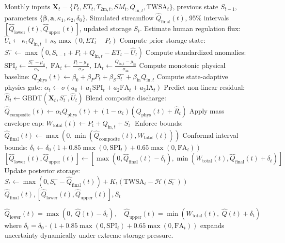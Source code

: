 \documentclass[11pt,a4paper,fleqn]{article}
\begin{document}
\begin{algorithm}[htbp]
\caption{SA-PG-MCH Dynamic State Estimation and Streamflow Inference}
\label{alg:sapgmch}
\begin{algorithmic}[1]
\REQUIRE Monthly inputs $\mathbf{X}_t = \{P_t, ET_t, T_{2\text{m},t}, SM_t, Q_{\text{in},t}, \text{TWSA}_t\}$, previous state $S_{t-1}$, parameters $\{\boldsymbol{\beta}, \mathbf{a}, \kappa_1, \kappa_2, \delta_0\}$.
\ENSURE Simulated streamflow $\hat{Q}_{\text{final}}(t)$, 95\% intervals $[\hat{Q}_{\text{lower}}(t), \hat{Q}_{\text{upper}}(t)]$, updated storage $S_t$.
\STATE Estimate human regulation flux: $\hat{U}_t \leftarrow \kappa_1 Q_{\text{in},t} + \kappa_2 \max(0, ET_t - P_t)$
\STATE Compute prior storage state: $S_t^- \leftarrow \max(0, S_{t-1} + P_t + Q_{\text{in},t} - ET_t - \hat{U}_t)$
\STATE Compute standardized anomalies: $\text{SPI}_t \leftarrow \frac{S_t^- - \mu_S}{\sigma_S}, \; \text{FA}_t \leftarrow \frac{P_t - \mu_P}{\sigma_P}, \; \text{IA}_t \leftarrow \frac{Q_{\text{in},t} - \mu_{\text{in}}}{\sigma_{\text{in}}}$
\STATE Compute monotonic physical baseline: $Q_{\text{phys}}(t) \leftarrow \beta_0 + \beta_P P_t + \beta_S S_t^- + \beta_{\text{in}} Q_{\text{in},t}$
\STATE Compute state-adaptive physics gate: $\alpha_t \leftarrow \sigma(a_0 + a_1 \text{SPI}_t + a_2 \text{FA}_t + a_3 \text{IA}_t)$
\STATE Predict non-linear residual: $\hat{R}_t \leftarrow \text{GBDT}(\mathbf{X}_t, S_t^-, \hat{U}_t)$
\STATE Blend composite discharge: $\hat{Q}_{\text{composite}}(t) \leftarrow \alpha_t Q_{\text{phys}}(t) + (1 - \alpha_t)(Q_{\text{phys}}(t) + \hat{R}_t)$
\STATE Apply mass envelope cap: $W_{\text{total}}(t) \leftarrow P_t + Q_{\text{in},t} + S_t^-$
\STATE Enforce bounds: $\hat{Q}_{\text{final}}(t) \leftarrow \max(0, \min(\hat{Q}_{\text{composite}}(t), W_{\text{total}}(t)))$
\STATE Conformal interval bounds: $\delta_t \leftarrow \delta_0(1 + 0.85\max(0,\text{SPI}_t) + 0.65\max(0,\text{FA}_t))$
\STATE $[\hat{Q}_{\text{lower}}(t), \hat{Q}_{\text{upper}}(t)] \leftarrow [\max(0, \hat{Q}_{\text{final}}(t) - \delta_t), \min(W_{\text{total}}(t), \hat{Q}_{\text{final}}(t) + \delta_t)]$
\STATE Update posterior storage: $S_t \leftarrow \max(0, S_t^- - \hat{Q}_{\text{final}}(t)) + K_t(\text{TWSA}_t - \mathcal{H}(S_t^-))$
\RETURN $\hat{Q}_{\text{final}}(t), [\hat{Q}_{\text{lower}}(t), \hat{Q}_{\text{upper}}(t)], S_t$
\end{algorithmic}
\end{algorithm}
\begin{equation}
\hat{Q}_{\text{lower}}(t) = \max\left(0, \; \hat{Q}(t) - \delta_t\right), \quad \hat{Q}_{\text{upper}}(t) = \min\left(W_{\text{total}}(t), \; \hat{Q}(t) + \delta_t\right)
\end{equation}
where $\delta_t = \delta_0 \cdot (1 + 0.85 \max(0, \text{SPI}_t) + 0.65 \max(0, \text{FA}_t))$ expands uncertainty dynamically under extreme storage pressure.
\end{document}
